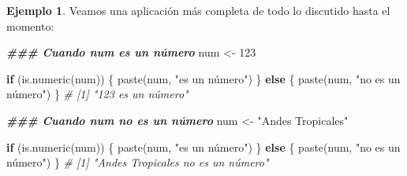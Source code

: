 \documentclass[
]{article}
\newenvironment{Shaded}{\begin{snugshade}}{\end{snugshade}}
\newcommand{\CommentTok}[1]{\textcolor[rgb]{0.56,0.35,0.01}{\textit{#1}}}
\newcommand{\ControlFlowTok}[1]{\textcolor[rgb]{0.13,0.29,0.53}{\textbf{#1}}}
\newcommand{\DecValTok}[1]{\textcolor[rgb]{0.00,0.00,0.81}{#1}}
\newcommand{\DocumentationTok}[1]{\textcolor[rgb]{0.56,0.35,0.01}{\textbf{\textit{#1}}}}
\newcommand{\FunctionTok}[1]{\textcolor[rgb]{0.00,0.00,0.00}{#1}}
\newcommand{\NormalTok}[1]{#1}
\newcommand{\OtherTok}[1]{\textcolor[rgb]{0.56,0.35,0.01}{#1}}
\newcommand{\StringTok}[1]{\textcolor[rgb]{0.31,0.60,0.02}{#1}}
\theoremstyle{definition}
\theoremstyle{definition}
\newtheorem{example}{Ejemplo}[section]
\theoremstyle{definition}
\theoremstyle{definition}
\theoremstyle{remark}
\begin{document}
\begin{example}

Veamos una aplicación más completa de todo lo discutido hasta el momento:

\begin{Shaded}
\begin{Highlighting}[]
\DocumentationTok{\#\#\# Cuando num es un número}
\NormalTok{num }\OtherTok{\textless{}{-}} \DecValTok{123}

\ControlFlowTok{if}\NormalTok{ (}\FunctionTok{is.numeric}\NormalTok{(num)) \{}
  \FunctionTok{paste}\NormalTok{(num, }\StringTok{"es un número"}\NormalTok{)}
\NormalTok{  \} }\ControlFlowTok{else}\NormalTok{ \{}
  \FunctionTok{paste}\NormalTok{(num, }\StringTok{"no es un número"}\NormalTok{)}
\NormalTok{    \}}
\CommentTok{\# [1] "123 es un número"}

\DocumentationTok{\#\#\# Cuando num no es un número}
\NormalTok{num }\OtherTok{\textless{}{-}} \StringTok{"Andes Tropicales"}

\ControlFlowTok{if}\NormalTok{ (}\FunctionTok{is.numeric}\NormalTok{(num)) \{}
  \FunctionTok{paste}\NormalTok{(num, }\StringTok{"es un número"}\NormalTok{)}
\NormalTok{  \} }\ControlFlowTok{else}\NormalTok{ \{}
    \FunctionTok{paste}\NormalTok{(num, }\StringTok{"no es un número"}\NormalTok{)}
\NormalTok{    \}}
\CommentTok{\# [1] "Andes Tropicales no es un número"}
\end{Highlighting}
\end{Shaded}

\end{example}
\end{document}
